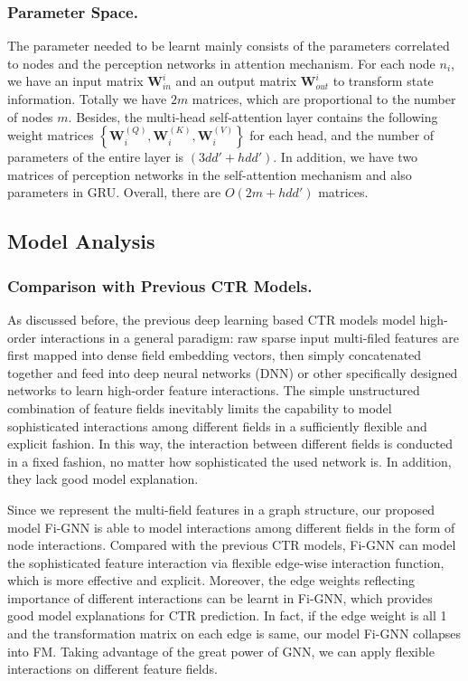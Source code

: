\documentclass[sigconf]{acmart}
\begin{document}
\subsubsection{\textbf{Parameter Space.}}
The parameter needed to be learnt mainly consists of the parameters correlated to nodes and the perception networks in attention mechanism.
For each node $n_{i}$, we have an input matrix $\mathbf{W}_{in}^{i}$ and an output matrix $\mathbf{W}_{out}^{i}$ to transform state information. 
Totally we have $2m$ matrices, which are proportional to the number of nodes $m$. 
Besides, the multi-head self-attention layer contains the following weight matrices $\left \{    \mathbf{W}_i^{(Q)},   \mathbf{W}_i^{(K)}, \mathbf{W}_i^{(V)}  \right \}$ for each head, and the number of parameters of the entire layer is $(3dd'+hdd')$.  
In addition, we have two matrices of perception networks in the self-attention mechanism and also parameters in GRU. 
Overall, there are $O(2m+hdd')$ matrices. 



 
 
\subsection{Model Analysis}
\subsubsection{\textbf{Comparison with Previous CTR Models.}}
As discussed before, the previous deep learning based CTR models model high-order interactions in a general paradigm:
raw sparse input multi-filed features are first mapped into dense field embedding vectors, then simply concatenated together and feed into deep neural networks (DNN) or other specifically designed networks to learn high-order feature interactions. 
The simple unstructured combination of feature fields inevitably limits the capability to model sophisticated interactions among different fields in a sufficiently flexible and explicit fashion.
In this way, the interaction between different fields is conducted in a fixed fashion, no matter how sophisticated the used network is.
In addition, they lack good model explanation.

Since we represent the multi-field features in a graph structure, our proposed model Fi-GNN is able to model interactions among different fields in the form of node interactions.
Compared with the previous CTR models, Fi-GNN can model the sophisticated feature interaction via flexible edge-wise interaction function, which is more effective and explicit.
Moreover, the edge weights reflecting importance of different interactions can be learnt in Fi-GNN, which provides good model explanations for CTR prediction.   
In fact, if the edge weight is all 1 and the transformation matrix on each edge is same, our model Fi-GNN collapses into FM.
Taking advantage of the great power of GNN, we can apply flexible interactions on different feature fields.
\end{document}
